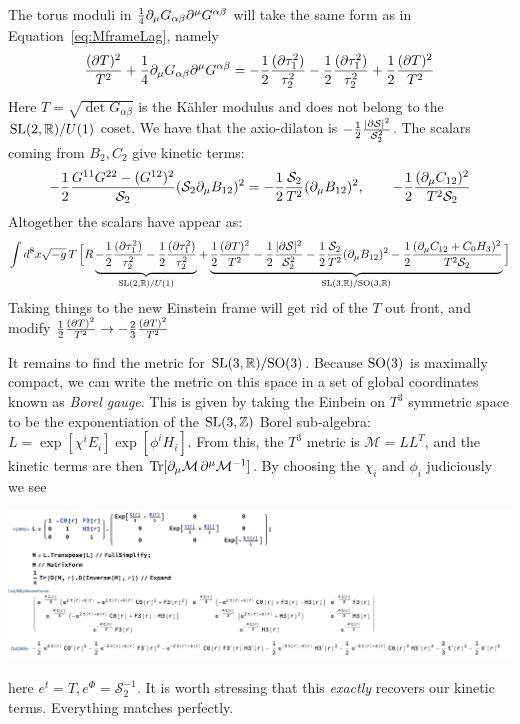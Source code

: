 \documentclass[11pt, class=article, crop=false]{standalone}
\begin{document}
\begin{enumerate}
	The torus moduli in $\frac14 \partial_\mu G_{\alpha \beta} \partial^\mu G^{\alpha \beta}$ will take the same form as in Equation~\eqref{eq:MframeLag}, namely
	\[
		\frac{(\partial T)^2}{T^2} + \frac14 \partial_\mu G_{\alpha \beta} \partial^\mu G^{\alpha \beta} = -\frac12 \frac{(\partial \tau_1^2)}{\tau_2^2} - \frac12 \frac{(\partial \tau_1^2)}{\tau_2^2} + \frac12 \frac{(\partial T)^2}{T^2}
	\]
	Here $T = \sqrt{\det G_{\alpha \beta}}$ is the K\"ahler modulus and does not belong to the $\mathrm{SL}(2, \mathbb{R})/U(1)$ coset. We have that the axio-dilaton is $-\frac12 \frac{|\partial \mathcal S|^2}{\mathcal S_2^2}$. 
	The scalars coming from $B_2, C_2$ give kinetic terms:
	\[
		-\frac12 \frac{G^{11} G^{22} - (G^{12})^2}{\mathcal S_2} (\mathcal S_2 \partial_\mu B_{12})^2 = - \frac12 \frac{\mathcal S_2}{T^2} (\partial_\mu B_{12})^2, \qquad - \frac12 \frac{(\partial_\mu C_{12})^2}{T^2 \mathcal S_2} 
	\]
	Altogether the scalars have appear as:
	\[
		\int d^{8} x \sqrt{-g}\, T \, \Big[R \underbrace{-\frac12 \frac{(\partial \tau_1^2)}{\tau_2^2} - \frac12 \frac{(\partial \tau_1^2)}{\tau_2^2}}_{\mathrm{SL}(2, \mathbb{R})/U(1)} + \underbrace{ \frac12 \frac{(\partial T)^2}{T^2} - \frac12 \frac{|\partial \mathcal S|^2}{\mathcal S_2^2} - \frac12 \frac{ \mathcal S_2}{T^2}  (\partial_\mu B_{12})^2 - \frac12 \frac{(\partial_\mu C_{12} + C_0 H_3)^2}{T^2 \mathcal S_2} }_{\mathrm{SL}(3, \mathbb{R})/\mathrm{SO}(3, \mathbb{R})} \Big]
	\]
	Taking things to the new Einstein frame will get rid of the $T$ out front, and modify $\frac12\frac{(\partial T)^2}{T^2} \to -\frac23 \frac{(\partial T)^2}{T^2}$
	
	It remains to find the metric for $\mathrm{SL}(3, \mathbb{R})/\mathrm{SO}(3)$. Because $\mathrm{SO}(3)$ is maximally compact, we can write the metric on this space in a set of global coordinates known as \emph{Borel gauge}. This is given by taking the Einbein on $T^3$ symmetric space to be the exponentiation of the $\mathrm{SL}(3,\mathbb{Z})$ Borel sub-algebra: $L = \exp[\chi^i E_i]\exp[\phi^i H_i]$. From this, the $T^3$ metric is $\mathcal M = L L^T$, and the kinetic terms are then $\mathrm{Tr} [\partial_\mu \mathcal M\, \partial^\mu \mathcal M^{-1}]$. 
	By choosing the $\chi_i$ and $\phi_i$ judiciously we see
	\begin{center}
		\hspace{-.3in} \includegraphics[scale=0.48]{"Figures/Borel Gauge"}
	\end{center}
	here $e^t = T, e^\Phi = \mathcal S_2^{-1}$. It is worth stressing that this \emph{exactly} recovers our kinetic terms. Everything matches perfectly. 
	

\end{enumerate}
\end{document}
